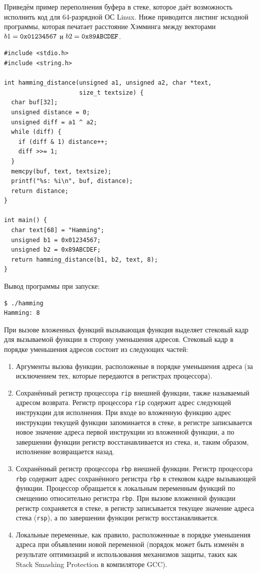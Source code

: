 Приведём пример переполнения буфера в стеке, которое даёт возможность исполнить код для 64-разрядной ОС Linux. Ниже приводится листинг исходной программы, которая печатает расстояние Хэмминга между векторами $b1 = \text{\texttt{0x01234567}}$ и $b2 = \text{\texttt{0x89ABCDEF}}$.

\begin{verbatim}
#include <stdio.h>
#include <string.h>

int hamming_distance(unsigned a1, unsigned a2, char *text,
                     size_t textsize) {
  char buf[32];
  unsigned distance = 0;
  unsigned diff = a1 ^ a2;
  while (diff) {
    if (diff & 1) distance++;
    diff >>= 1;
  }
  memcpy(buf, text, textsize);
  printf("%s: %i\n", buf, distance);
  return distance;
}

int main() {
  char text[68] = "Hamming";
  unsigned b1 = 0x01234567;
  unsigned b2 = 0x89ABCDEF;
  return hamming_distance(b1, b2, text, 8);
}
\end{verbatim}

Вывод программы при запуске:
\begin{verbatim}
$ ./hamming
Hamming: 8
\end{verbatim}

При вызове вложенных функций вызывающая функция выделяет стековый кадр для вызываемой функции в сторону уменьшения адресов. Стековый кадр в порядке уменьшения адресов состоит из следующих частей:
\begin{enumerate}
    \item Аргументы вызова функции, расположеные в порядке уменьшения адреса (за исключением тех, которые передаются в регистрах процессора).
    \item Сохранённый регистр процессора \texttt{rip} внешней функции, также называемый адресом возврата. Регистр процессора \texttt{rip} содержит адрес следующей инструкции для исполнения. При входе во вложенную функцию адрес инструкции текущей функции запоминается в стеке, в регистре записывается новое значение адреса первой инструкции из вложенной функции, а по завершении функции регистр восстанавливается из стека, и, таким образом, исполнение возвращается назад.
    \item Сохранённый регистр процессора \texttt{rbp} внешней функции. Регистр процессора \texttt{rbp} содержит адрес сохранённого регистра \texttt{rbp} в стековом кадре вызывающей функции. Процессор обращается к локальным переменным функций по смещению относительно регистра \texttt{rbp}. При вызове вложенной функции регистр сохраняется в стеке, в регистр записывается текущее значение адреса стека (\texttt{rsp}), а по завершении функции регистр восстанавливается.
    \item Локальные переменные, как правило, расположенные в порядке уменьшения адреса при объявлении новой переменной (порядок может быть изменён в результате оптимизаций и использования механизмов защиты, таких как Stack Smashing Protection в компиляторе GCC).
\end{enumerate}

